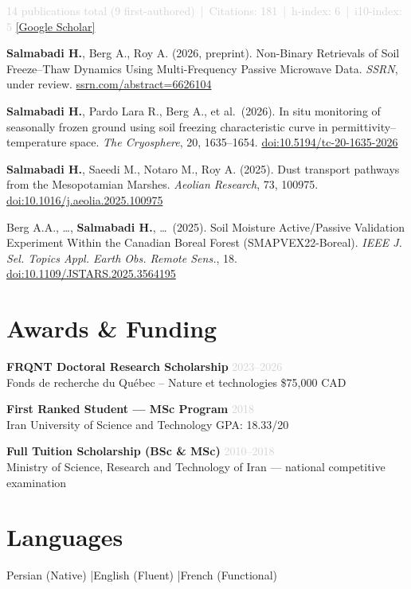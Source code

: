 \documentclass[10pt, a4paper]{article}
\newcommand{\dategray}[1]{\textcolor{lightgray}{\small #1}}
\newcommand{\publication}[1]{\noindent #1 \vspace{3pt}}
\begin{document}
\noindent\textcolor{lightgray}{\small
  14 publications total (9 first-authored) \,|\,
  Citations: 181 \,|\, h-index: 6 \,|\, i10-index: 5 \quad
  \href{https://scholar.google.com/citations?user=QAvXX3cAAAAJ}{[Google Scholar]}
}

\vspace{4pt}

\publication{\textbf{Salmabadi H.}, Berg A., Roy A. (2026, preprint).
Non-Binary Retrievals of Soil Freeze–Thaw Dynamics Using Multi-Frequency
Passive Microwave Data. \textit{SSRN}, under review.
\href{https://ssrn.com/abstract=6626104}{ssrn.com/abstract=6626104}}

\publication{\textbf{Salmabadi H.}, Pardo Lara R., Berg A., et al.\ (2026).
In situ monitoring of seasonally frozen ground using soil freezing characteristic
curve in permittivity–temperature space. \textit{The Cryosphere}, 20, 1635–1654.
\href{https://doi.org/10.5194/tc-20-1635-2026}{doi:10.5194/tc-20-1635-2026}}

\publication{\textbf{Salmabadi H.}, Saeedi M., Notaro M., Roy A. (2025).
Dust transport pathways from the Mesopotamian Marshes.
\textit{Aeolian Research}, 73, 100975.
\href{https://doi.org/10.1016/j.aeolia.2025.100975}{doi:10.1016/j.aeolia.2025.100975}}

\publication{Berg A.A., \ldots, \textbf{Salmabadi H.}, \ldots\ (2025).
Soil Moisture Active/Passive Validation Experiment Within the Canadian Boreal
Forest (SMAPVEX22-Boreal). \textit{IEEE J. Sel. Topics Appl. Earth Obs.
Remote Sens.}, 18.
\href{https://doi.org/10.1109/JSTARS.2025.3564195}{doi:10.1109/JSTARS.2025.3564195}}

\section{Awards \& Funding}

\noindent\textbf{FRQNT Doctoral Research Scholarship} \hfill \dategray{2023--2026}\\
Fonds de recherche du Québec – Nature et technologies \quad \$75,000 CAD

\vspace{4pt}
\noindent\textbf{First Ranked Student --- MSc Program} \hfill \dategray{2018}\\
Iran University of Science and Technology \quad GPA: 18.33/20

\vspace{4pt}
\noindent\textbf{Full Tuition Scholarship (BSc \& MSc)} \hfill \dategray{2010--2018}\\
Ministry of Science, Research and Technology of Iran --- national competitive examination

\section{Languages}

Persian (Native) \quad|\quad English (Fluent) \quad|\quad French (Functional)

\end{document}

